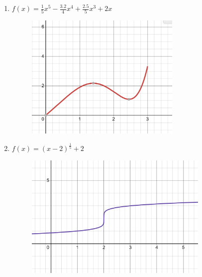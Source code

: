 \documentclass[12pt]{article}
\begin{document}
\begin{enumerate}
    \item $f(x)=\frac{1}{5}x^{5}-\frac{3.2}{4}x^{4}+\frac{2.5}{5}x^{3}+2x$

\begin{figure}[h!]
\centering
\includegraphics[height=6cm]{G1.1.jpeg}
\captionsetup{labelformat=empty}
\end{figure}

    \item $f(x)=\left(x-2\right)^{\frac{1}{5}}+2$


\begin{figure}[h!]
\centering
\includegraphics[height=6cm]{G1.2.jpeg}
\captionsetup{labelformat=empty}
\end{figure}

\end{enumerate}
\end{document}
